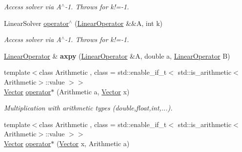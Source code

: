 \begin{DoxyCompactItemize}
\begin{DoxyCompactList}\small\item\em \-Access solver via \-A$^\wedge$-\/1. \-Throws for k!=-\/1. \end{DoxyCompactList}\item 
\hypertarget{namespaceSpacy_a6defec6ee302bf4c1054afc65c9fcb95}{\-Linear\-Solver \hyperlink{namespaceSpacy_a6defec6ee302bf4c1054afc65c9fcb95}{operator$^\wedge$} (\hyperlink{classSpacy_1_1LinearOperator}{\-Linear\-Operator} \&\&\-A, int k)}\label{namespaceSpacy_a6defec6ee302bf4c1054afc65c9fcb95}

\begin{DoxyCompactList}\small\item\em \-Access solver via \-A$^\wedge$-\/1. \-Throws for k!=-\/1. \end{DoxyCompactList}\item 
\hypertarget{namespaceSpacy_ad08055ec05275c6042d516d4726b5e8f}{\hyperlink{classSpacy_1_1LinearOperator}{\-Linear\-Operator} \& {\bfseries axpy} (\hyperlink{classSpacy_1_1LinearOperator}{\-Linear\-Operator} \&\-A, double a, \hyperlink{classSpacy_1_1LinearOperator}{\-Linear\-Operator} \-B)}\label{namespaceSpacy_ad08055ec05275c6042d516d4726b5e8f}

\item 
\hypertarget{namespaceSpacy_ae0a1cbb3d98d6ac0a82727959038f4b4}{{\footnotesize template$<$class Arithmetic , class  = std\-::enable\-\_\-if\-\_\-t$<$ std\-::is\-\_\-arithmetic$<$\-Arithmetic$>$\-::value $>$$>$ }\\\hyperlink{classSpacy_1_1Vector}{\-Vector} \hyperlink{namespaceSpacy_ae0a1cbb3d98d6ac0a82727959038f4b4}{operator$\ast$} (\-Arithmetic a, \hyperlink{classSpacy_1_1Vector}{\-Vector} x)}\label{namespaceSpacy_ae0a1cbb3d98d6ac0a82727959038f4b4}

\begin{DoxyCompactList}\small\item\em \-Multiplication with arithmetic types (double,float,int,...). \end{DoxyCompactList}\item 
\hypertarget{namespaceSpacy_a0120fd6b1d7580a9f7b8f24e646cbc6c}{{\footnotesize template$<$class Arithmetic , class  = std\-::enable\-\_\-if\-\_\-t$<$ std\-::is\-\_\-arithmetic$<$\-Arithmetic$>$\-::value $>$$>$ }\\\hyperlink{classSpacy_1_1Vector}{\-Vector} \hyperlink{namespaceSpacy_a0120fd6b1d7580a9f7b8f24e646cbc6c}{operator$\ast$} (\hyperlink{classSpacy_1_1Vector}{\-Vector} x, \-Arithmetic a)}\label{namespaceSpacy_a0120fd6b1d7580a9f7b8f24e646cbc6c}


\end{DoxyCompactItemize}
